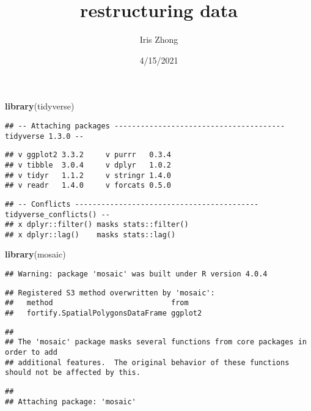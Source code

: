 \documentclass[
]{article}
\title{restructuring data}
\author{Iris Zhong}
\date{4/15/2021}
\newenvironment{Shaded}{\begin{snugshade}}{\end{snugshade}}
\newcommand{\KeywordTok}[1]{\textcolor[rgb]{0.13,0.29,0.53}{\textbf{#1}}}
\newcommand{\NormalTok}[1]{#1}
\begin{document}
\maketitle

\begin{Shaded}
\begin{Highlighting}[]
\KeywordTok{library}\NormalTok{(tidyverse)}
\end{Highlighting}
\end{Shaded}

\begin{verbatim}
## -- Attaching packages --------------------------------------- tidyverse 1.3.0 --
\end{verbatim}

\begin{verbatim}
## v ggplot2 3.3.2     v purrr   0.3.4
## v tibble  3.0.4     v dplyr   1.0.2
## v tidyr   1.1.2     v stringr 1.4.0
## v readr   1.4.0     v forcats 0.5.0
\end{verbatim}

\begin{verbatim}
## -- Conflicts ------------------------------------------ tidyverse_conflicts() --
## x dplyr::filter() masks stats::filter()
## x dplyr::lag()    masks stats::lag()
\end{verbatim}

\begin{Shaded}
\begin{Highlighting}[]
\KeywordTok{library}\NormalTok{(mosaic)}
\end{Highlighting}
\end{Shaded}

\begin{verbatim}
## Warning: package 'mosaic' was built under R version 4.0.4
\end{verbatim}

\begin{verbatim}
## Registered S3 method overwritten by 'mosaic':
##   method                           from   
##   fortify.SpatialPolygonsDataFrame ggplot2
\end{verbatim}

\begin{verbatim}
## 
## The 'mosaic' package masks several functions from core packages in order to add 
## additional features.  The original behavior of these functions should not be affected by this.
\end{verbatim}

\begin{verbatim}
## 
## Attaching package: 'mosaic'
\end{verbatim}
\end{document}
